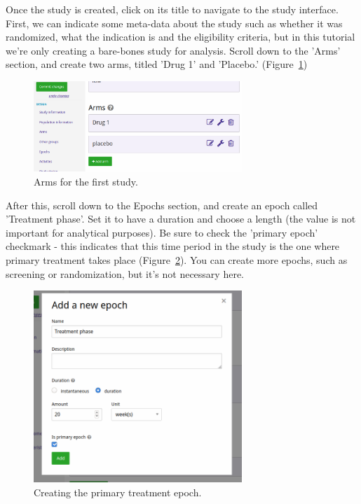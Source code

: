 \documentclass[12pt]{article}
\begin{document}
Once the study is created, click on its title to navigate to the study interface.
First, we can indicate some meta-data about the study such as whether it was randomized, what the indication is and the eligibility criteria, but in this tutorial we're only creating a bare-bones study for analysis.
Scroll down to the 'Arms' section, and create two arms, titled 'Drug 1' and 'Placebo.' (Figure~\ref{fig:arms})

\begin{figure}[!ht]
  \centering
  \includegraphics[width=0.7\textwidth]{img/arms.png}
  \caption{Arms for the first study.}
\label{fig:arms}
\end{figure}

After this, scroll down to the Epochs section, and create an epoch called 'Treatment phase'.
Set it to have a duration and choose a length (the value is not important for analytical purposes).
Be sure to check the 'primary epoch' checkmark - this indicates that this time period in the study is the one where primary treatment takes place (Figure~\ref{fig:createMainPhase}).
You can create more epochs, such as screening or randomization, but it's not necessary here.

\begin{figure}[!ht]
  \centering
  \includegraphics[width=0.7\textwidth]{img/createMainPhase.png}
  \caption{Creating the primary treatment epoch.}
\label{fig:createMainPhase}
\end{figure}
\end{document}
